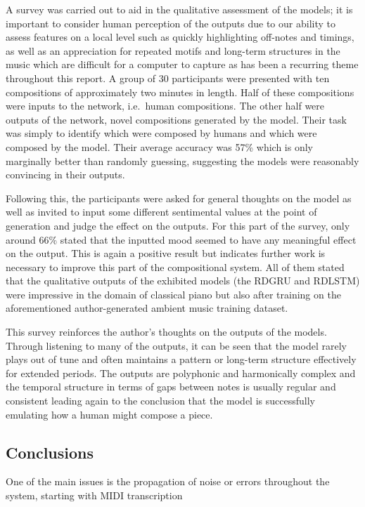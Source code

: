 \documentclass[12pt,]{article}
\begin{document}
A survey was carried out to aid in the qualitative assessment of the
models; it is important to consider human perception of the outputs due
to our ability to assess features on a local level such as quickly
highlighting off-notes and timings, as well as an appreciation for
repeated motifs and long-term structures in the music which are
difficult for a computer to capture as has been a recurring theme
throughout this report. A group of 30 participants were presented with
ten compositions of approximately two minutes in length. Half of these
compositions were inputs to the network, i.e.~human compositions. The
other half were outputs of the network, novel compositions generated by
the model. Their task was simply to identify which were composed by
humans and which were composed by the model. Their average accuracy was
57\% which is only marginally better than randomly guessing, suggesting
the models were reasonably convincing in their outputs.

Following this, the participants were asked for general thoughts on the
model as well as invited to input some different sentimental values at
the point of generation and judge the effect on the outputs. For this
part of the survey, only around 66\% stated that the inputted mood
seemed to have any meaningful effect on the output. This is again a
positive result but indicates further work is necessary to improve this
part of the compositional system. All of them stated that the
qualitative outputs of the exhibited models (the RDGRU and RDLSTM) were
impressive in the domain of classical piano but also after training on
the aforementioned author-generated ambient music training dataset.

This survey reinforces the author's thoughts on the outputs of the
models. Through listening to many of the outputs, it can be seen that
the model rarely plays out of tune and often maintains a pattern or
long-term structure effectively for extended periods. The outputs are
polyphonic and harmonically complex and the temporal structure in terms
of gaps between notes is usually regular and consistent leading again to
the conclusion that the model is successfully emulating how a human
might compose a piece.

\hypertarget{conclusions}{%
\subsection{Conclusions}\label{conclusions}}

One of the main issues is the propagation of noise or errors throughout
the system, starting with MIDI transcription
\end{document}
